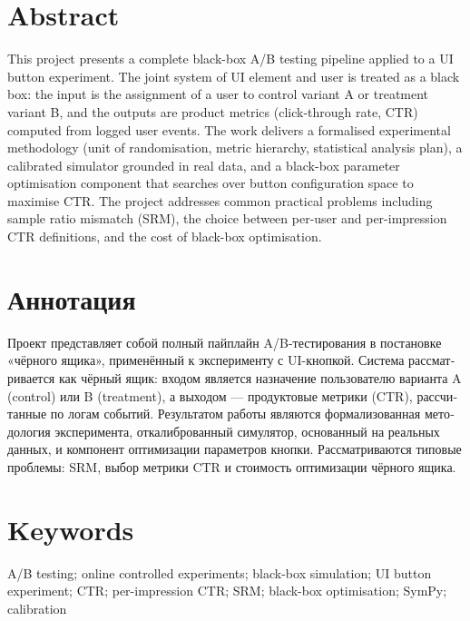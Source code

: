\documentclass[a4paper,12pt]{extarticle}
\numberwithin{equation}{section}
\begin{document}

\clearpage

\setcounter{page}{2}

{
  \hypersetup{linkcolor=black}
  \tableofcontents
}
\clearpage

\section*{Abstract}
This project presents a complete black-box A/B testing pipeline applied to
a UI button experiment. The joint system of UI element and user is treated
as a black box: the input is the assignment of a user to control variant A or
treatment variant B, and the outputs are product metrics (click-through rate,
CTR) computed from logged user events. The work delivers a formalised
experimental methodology (unit of randomisation, metric hierarchy, statistical
analysis plan), a calibrated simulator grounded in real data, and a
black-box parameter optimisation component that searches over button
configuration space to maximise CTR. The project addresses common practical
problems including sample ratio mismatch (SRM), the choice between per-user
and per-impression CTR definitions, and the cost of black-box optimisation.

\section*{Аннотация}
\begin{otherlanguage}{russian}
Проект представляет собой полный пайплайн A/B-тестирования в постановке
«чёрного ящика», применённый к эксперименту с UI-кнопкой. Система
рассматривается как чёрный ящик: входом является назначение пользователю
варианта A (control) или B (treatment), а выходом --- продуктовые метрики
(CTR), рассчитанные по логам событий. Результатом работы являются
формализованная методология эксперимента, откалиброванный симулятор,
основанный на реальных данных, и компонент оптимизации параметров кнопки.
Рассматриваются типовые проблемы: SRM, выбор метрики CTR и стоимость
оптимизации чёрного ящика.
\end{otherlanguage}

\section*{Keywords}
A/B testing; online controlled experiments; black-box simulation; UI button
experiment; CTR; per-impression CTR; SRM; black-box optimisation; SymPy;
calibration
\end{document}
